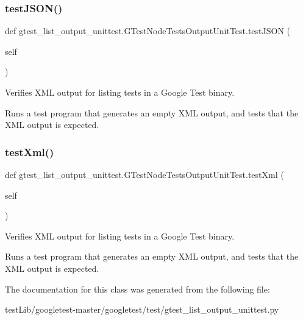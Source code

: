 \subsubsection{\texorpdfstring{test\+J\+S\+O\+N()}{testJSON()}}
{\footnotesize\ttfamily def gtest\+\_\+list\+\_\+output\+\_\+unittest.\+G\+Test\+Node\+Tests\+Output\+Unit\+Test.\+test\+J\+S\+ON (\begin{DoxyParamCaption}\item[{}]{self }\end{DoxyParamCaption})}

\begin{DoxyVerb}Verifies XML output for listing tests in a Google Test binary.

Runs a test program that generates an empty XML output, and
tests that the XML output is expected.
\end{DoxyVerb}
 \mbox{\label{classgtest__list__output__unittest_1_1GTestListTestsOutputUnitTest_ad3088bc8ee3a0abdabbf1b90507e272e}} 
\subsubsection{\texorpdfstring{test\+Xml()}{testXml()}}
{\footnotesize\ttfamily def gtest\+\_\+list\+\_\+output\+\_\+unittest.\+G\+Test\+Node\+Tests\+Output\+Unit\+Test.\+test\+Xml (\begin{DoxyParamCaption}\item[{}]{self }\end{DoxyParamCaption})}

\begin{DoxyVerb}Verifies XML output for listing tests in a Google Test binary.

Runs a test program that generates an empty XML output, and
tests that the XML output is expected.
\end{DoxyVerb}
 

The documentation for this class was generated from the following file\+:\begin{DoxyCompactItemize}
\item 
test\+Lib/googletest-\/master/googletest/test/gtest\+\_\+list\+\_\+output\+\_\+unittest.\+py\end{DoxyCompactItemize}
